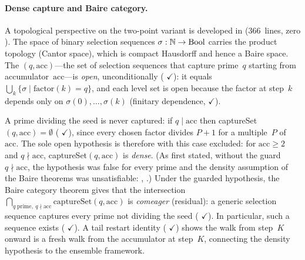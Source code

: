 \paragraph{Dense capture and Baire category.}
A topological perspective on the two-point variant is developed in
 (366~lines, zero ).
The space of binary selection sequences $\sigma : \mathbb{N} \to \mathrm{Bool}$
carries the product topology (Cantor space), which is compact Hausdorff
and hence a Baire space.  The $(q, \mathrm{acc})$---the
set of selection sequences that capture prime~$q$ starting from
accumulator~$\mathrm{acc}$---is \emph{open}, unconditionally
(
{\color{leanink}$\checkmark$}):
it equals $\bigcup_k \{\sigma \mid \mathrm{factor}(k) = q\}$,
and each level set is open because the factor at step~$k$
depends only on $\sigma(0), \ldots, \sigma(k)$ (finitary dependence,
{\color{leanink}$\checkmark$}).

A prime dividing the seed is never captured: if $q \mid \mathrm{acc}$
then captureSet$(q, \mathrm{acc}) = \emptyset$
(
{\color{leanink}$\checkmark$}), since every chosen factor divides
$P + 1$ for a multiple~$P$ of~$\mathrm{acc}$.  The sole open
hypothesis is therefore  with this
case excluded: for $\mathrm{acc} \geq 2$ and $q \nmid \mathrm{acc}$,
captureSet$(q, \mathrm{acc})$ is \emph{dense}.  (As first stated, without
the guard $q \nmid \mathrm{acc}$, the hypothesis was false for every
prime and the density assumption of the Baire theorems was unsatisfiable:
,
.)
Under the guarded hypothesis, the Baire category theorem gives that the
intersection
$\bigcap_{q\;\text{prime},\ q \nmid \mathrm{acc}} \mathrm{captureSet}(q, \mathrm{acc})$
is \emph{comeager} (residual): a generic selection sequence captures
every prime not dividing the seed
(
{\color{leanink}$\checkmark$}).
In particular, such a sequence exists
(
{\color{leanink}$\checkmark$}).
A tail restart identity
(
{\color{leanink}$\checkmark$})
shows the walk from step~$K$ onward is a fresh walk from the
accumulator at step~$K$, connecting the density hypothesis to
the ensemble framework.


